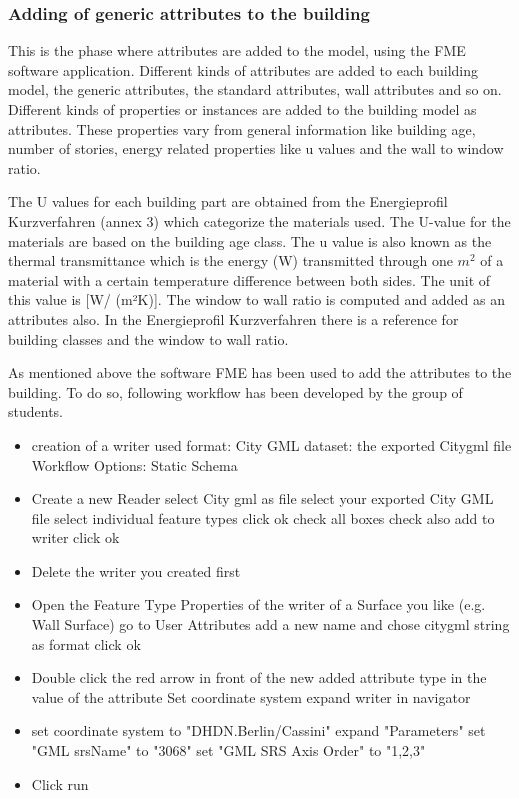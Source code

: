 \subsubsection{Adding of generic attributes to the building} 

This is the phase where attributes are added to the model, using the FME software application. Different kinds of attributes are added to each building model, the generic attributes, the standard attributes, wall attributes and so on.  Different kinds of properties or instances are added to the building model as attributes. These properties vary from general information like building age, number of stories, energy related properties like u values and the wall to window ratio.

The U values for each building part are obtained from the Energieprofil Kurzverfahren (annex 3) which categorize the materials used. The U-value for the materials are based on the building age class. The u value is also known as the thermal transmittance which is the energy (W) transmitted through one $m^2$ of a material with a certain temperature difference between both sides. The unit of this value is [W/ (m²K)].
The window to wall ratio is computed and added as an attributes also. In the Energieprofil Kurzverfahren there is a reference for building classes and the window to wall ratio.

As mentioned above the software FME has been used to add the attributes to the building. To do so, following workflow has been developed by the group of students.

\begin{itemize}
\item creation of a writer
\subitem used format: City GML
\subitem dataset: the exported Citygml file
\subitem Workflow Options: Static Schema
\item Create a new Reader
\subitem select City gml as file
\subitem select your exported City GML file
\subitem select individual feature types
\subitem click ok
\subitem check all boxes
\subitem check also add to writer
\subitem click ok
\item Delete the writer you created first
\item Open the Feature Type Properties of the writer of a Surface you like (e.g. Wall Surface)
\subitem go to User Attributes
\subitem add a new name and chose citygml string as format
\subitem click ok
\item Double click the red arrow in front of the new added attribute
\subitem type in the value of the attribute
\subitem Set coordinate system
\subitem expand writer in navigator
\item set coordinate system to "DHDN.Berlin/Cassini"
\subitem expand "Parameters"
\subitem set "GML srsName" to "3068"
\subitem set "GML SRS Axis Order" to "1,2,3"
\item Click run
\end{itemize}


